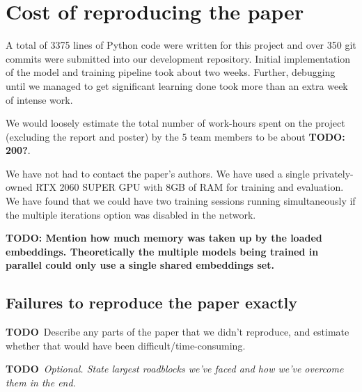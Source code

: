 \documentclass[a4paper, 10pt, conference]{article}
\newcommand{\TODO}{{\color{red}\textbf{TODO}}}
\newcommand{\TODOx}[1]{{\color{red}\textbf{TODO: #1}}}
\begin{document}
\section{Cost of reproducing the paper}

A total of 3375 lines of Python code were written for this project and over 350 git commits were submitted into our development repository. Initial implementation of the model and training pipeline took about two weeks. Further, debugging until we managed to get significant learning done took more than an extra week of intense work.

We would loosely estimate the total number of work-hours spent on the project (excluding the report and poster) by the 5 team members to be about \TODOx{200?}.

We have not had to contact the paper's authors.
We have used a single privately-owned RTX 2060 SUPER GPU with 8GB of RAM for training and evaluation. We have found that we could have two training sessions running simultaneously if the multiple iterations option was disabled in the network.

\TODOx{Mention how much memory was taken up by the loaded embeddings. Theoretically the multiple models being trained in parallel could only use a single shared embeddings set.}

\subsection{Failures to reproduce the paper exactly}
\TODO\ Describe any parts of the paper that we didn't reproduce, and estimate whether that would have been difficult/time-consuming.

\TODO\ \textit{Optional. State largest roadblocks we've faced and how we've overcome them in the end.}


\end{document}
